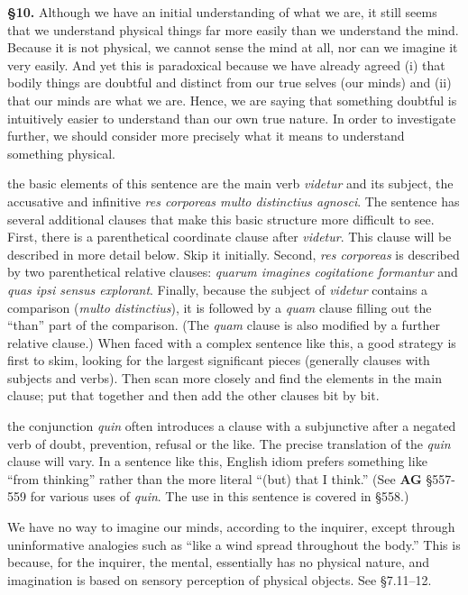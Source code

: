 \prenotes

\textbf{§10.} Although we have an initial understanding of what we are, it still seems that we understand physical things far more easily than we understand the mind. Because it is not physical, we cannot sense the mind at all, nor can we imagine it very easily. And yet this is paradoxical because we have already agreed (i) that bodily things are doubtful and distinct from our true selves (our minds) and (ii) that our minds are what we are. Hence, we are saying that something doubtful is intuitively easier to understand than our own true nature. In order to investigate further, we should consider more precisely what it means to understand something physical.

 the basic elements of this sentence are the main verb \textit{videtur} and its subject, the accusative and infinitive \textit{res corporeas multo distinctius agnosci}. The sentence has several additional clauses that make this basic structure more difficult to see. First, there is a parenthetical coordinate clause after \textit{videtur}. This clause will be described in more detail below. Skip it initially. Second, \textit{res corporeas} is described by two parenthetical relative clauses: \textit{quarum imagines cogitatione formantur} and \textit{quas ipsi sensus explorant}. Finally, because the subject of \textit{videtur} contains a comparison (\textit{multo distinctius}), it is followed by a \textit{quam} clause filling out the ``than'' part of the comparison. (The \textit{quam} clause is also modified by a further relative clause.) When faced with a complex sentence like this, a good strategy is first to skim, looking for the largest significant pieces (generally clauses with subjects and verbs). Then scan more closely and find the elements in the main clause; put that together and then add the other clauses bit by bit.

 the conjunction \textit{quin} often introduces a clause with a subjunctive after a negated verb of doubt, prevention, refusal or the like. The precise translation of the \textit{quin} clause will vary. In a sentence like this, English idiom prefers something like ``from thinking'' rather than the more literal ``(but) that I think.'' (See \textbf{AG} §557-559 for various uses of \textit{quin}. The use in this sentence is covered in §558.)

 We have no way to imagine our minds, according to the inquirer, except through uninformative analogies such as ``like a wind spread throughout the body.'' This is because, for the inquirer, the mental, essentially has no physical nature, and imagination is based on sensory perception of physical objects. See §7.11--12.

